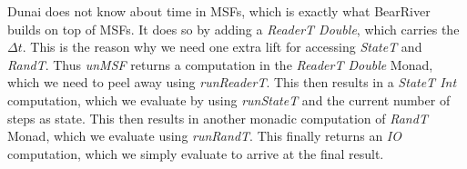 Dunai does not know about time in MSFs, which is exactly what BearRiver builds on top of MSFs. It does so by adding a \textit{ReaderT Double}, which carries the $\Delta t$. This is the reason why we need one extra lift for accessing \textit{StateT} and \textit{RandT}. Thus \textit{unMSF} returns a computation in the \textit{ReaderT Double} Monad, which we need to peel away using \textit{runReaderT}. This then results in a \textit{StateT Int} computation, which we evaluate by using \textit{runStateT} and the current number of steps as state. This then results in another monadic computation of \textit{RandT} Monad, which we evaluate using \textit{runRandT}. This finally returns an \textit{IO} computation, which we simply evaluate to arrive at the final result.